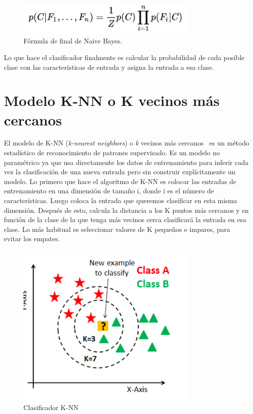 \documentclass[a4paper, 12pt]{book}
\begin{document}
\begin{figure}
	\centering
	\includegraphics[width=9cm, keepaspectratio]{img/ffinalbayes}
	\caption{Fórmula de final de Naive Bayes.}\label{fig:ffinalbayes}
\end{figure}

Lo que hace el clasificador finalmente es calcular la probabilidad de cada posible clase con las características de entrada y asigna la entrada a esa clase.

\section{Modelo K-NN o K vecinos más cercanos} 
\label{sec:modeloknn}

El modelo de K-NN (\emph{k-nearest neighbors}) o \emph{k} vecinos más cercanos~\cite{knn1,knn2} es un método estadístico de reconocimiento de patrones supervisado. Es un modelo no paramétrico ya que usa directamente los datos de entrenamiento para inferir cada vez la clasificación de una nueva entrada pero sin construir explícitamente un modelo. Lo primero que hace el algoritmo de K-NN es colocar las entradas de entrenamiento en una dimensión de tamaño i, donde i es el número de características. Luego coloca la entrada que queremos clasificar en esta misma dimensión. Después de esto, calcula la distancia a los K puntos más cercanos y en función de la clase de la que tenga más vecinos cerca clasificará la entrada en esa clase. Lo más habitual es seleccionar valores de K pequeños e impares, para evitar los empates. 

\begin{figure}
	\centering
	\includegraphics[width=9cm, keepaspectratio]{img/knn}
	\caption{Clasificador K-NN}\label{fig:knn}
\end{figure}
\end{document}
